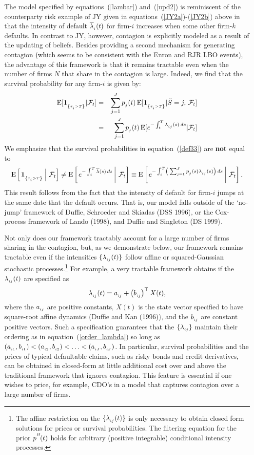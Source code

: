 \documentclass[titlepage,11pt]{article}
\def\big{\begin{array}{c} \\ \end{array} \!\!\!\!\!}
\def\bq{\begin{equation}}
\def\eq{\end{equation}}
\def\by{\begin{eqnarray}}
\def\ey{\end{eqnarray}}
\begin{document}
The model specified by equations~(\ref{lambar}) and~(\ref{upd2}) is
reminiscent of the counterparty risk example of JY given in
equations~(\ref{JY2a})-(\ref{JY2b}) above in that the intensity of
default $\overline{\lambda}_{_{{i}}}(t)$ for firm-$i$ increases when some other
firm-$k$ defaults. In contrast to JY, however, contagion is
explicitly modeled as a result of the updating of beliefs.  Besides
providing a second mechanism for generating contagion (which seems
to be consistent with the Enron and RJR LBO events), the advantage
of this framework is that it remains tractable even when the number
of firms $N$ that share in the contagion is large.  Indeed, we find
that the survival probability for any firm-$i$ is given by: \by
\E[\ind{\tau\sub{i}>T}|\F_t] &=& \sum_{j=1}^{J} p\sub{j}(t) \,
\E[\ind{\tau\sub{i}>T}| \tilde{S} = j, \, \F_t] \nonumber \\
\label{def33}
%
&=& \sum_{j=1}^{J} p\sub{j}(t) \, \E[e^{-\int_t^T \lambda\sub{ij}(s)
\, ds}| \F_t] \ey We emphasize that the survival probabilities in
equation~(\ref{def33}) are {\bf  not} equal to \bq\label{nocox} \E
\left[ \left. \ind{\tau\sub{i} >T}\, \right| \,\F_t \right] \neq \E
\left[ \left. e^{-\int_t^T \lb(s) \, ds} \, \right| \,\F_t \right]
\equiv \E \left[ \left. e^{-\int_t^T \left( \big \!\! \sum_{j=1}^{J}
p\sub{j}(s) \lambda\sub{ij}(s) \right) \, ds} \, \right| \, \F_t
\right] . \eq This result follows from the fact that the intensity
of default for firm-$i$ jumps at the same date that the default
occurs.  That is, our model falls outside of the `no-jump' framework
of Duffie, Schroeder and Skiadas (DSS 1996), or the Cox-process
framework of Lando (1998), and Duffie and Singleton (DS 1999).
\nocite{lan98} \nocite{dufsch96} \nocite{dufsin99}

Not only does our framework tractably account for a large number of
firms sharing in the contagion, but, as we demonstrate below, our
framework remains tractable even if  the intensities $\{
\lambda_{_{{ij}}}(t) \}$ follow affine or squared-Gaussian stochastic
processes.\footnote{The affine restriction on the
$\{\lambda_{_{{ij}}}(t)\}$ is only necessary to obtain closed form
solutions for prices or survival probabilities. The filtering
equation for the prior $p^{^{{H}}}\!(t)$ holds for arbitrary (positive
integrable) conditional intensity processes.}  For example, a very
tractable framework obtains if the $\lambda_{_{{ij}}}(t)$ are specified as
\bq\label{xvar} \lij(t)= a\sub{ij} + \left( b\sub{ij} \right)^{\top}
X(t), \eq where the $a_{_{{ij}}}$ are positive constants, $X(t)$ is
the state vector specified to have square-root affine dynamics
(Duffie and Kan (1996)), and the $b_{_{{ij}}}$ are constant positive
vectors. Such a specification guarantees that the
$\{\lambda_{_{{ij}}}\}$ maintain their ordering as in
equation~(\ref{order_lambda}) so long as $(a_{_{{i1}}},b_{_{{i1}}}) <
(a_{_{{i2}}},b_{_{{i2}}})< \ldots < (a_{_{{iJ}}},b_{_{{iJ}}})$. In
particular, survival probabilities and the prices of typical
defaultable claims, such as risky bonds and credit derivatives, can
be obtained in closed-form at little additional cost over and above
the traditional framework that ignores contagion.  This feature is
essential if one wishes to price, for example, CDO's in a model that
captures contagion over a large number of firms.
\end{document}
